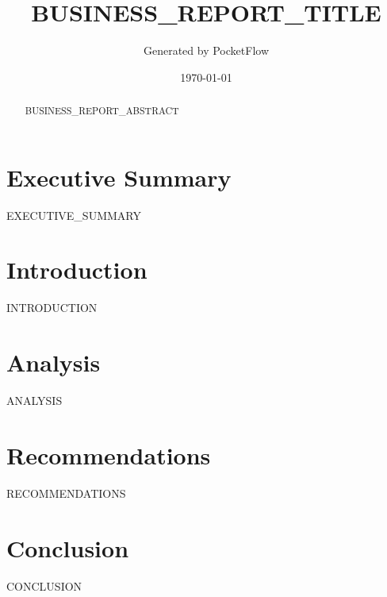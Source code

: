\documentclass[11pt,a4paper]{article}
\begin{document}
\title{BUSINESS_REPORT_TITLE}
\author{Generated by PocketFlow}
\date{\today}

\maketitle

\begin{abstract}
BUSINESS_REPORT_ABSTRACT
\end{abstract}

\tableofcontents
\newpage

\section{Executive Summary}
EXECUTIVE_SUMMARY

\section{Introduction}
INTRODUCTION

\section{Analysis}
ANALYSIS

\section{Recommendations}
RECOMMENDATIONS

\section{Conclusion}
CONCLUSION
\end{document}
